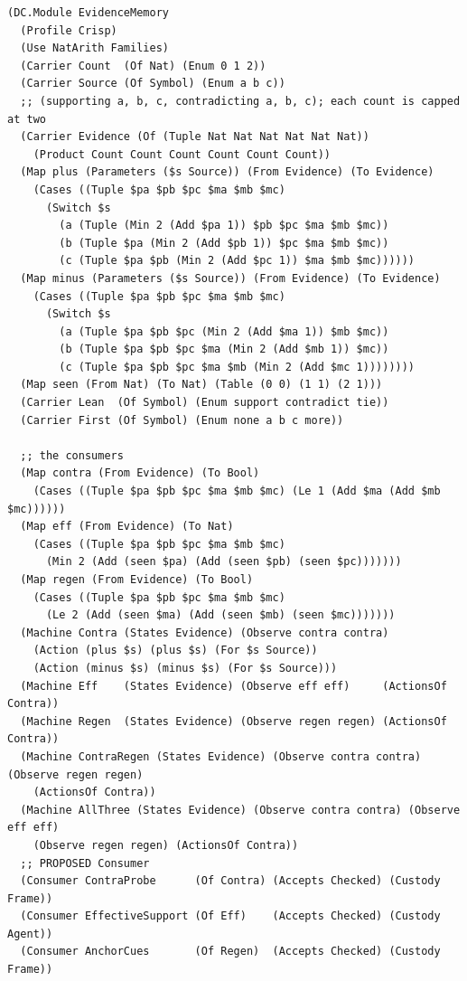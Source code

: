 \documentclass[11pt]{article}
\theoremstyle{definition}
\theoremstyle{plain}
\begin{document}
\begin{lstlisting}[style=mettamod]
(DC.Module EvidenceMemory
  (Profile Crisp)
  (Use NatArith Families)
  (Carrier Count  (Of Nat) (Enum 0 1 2))
  (Carrier Source (Of Symbol) (Enum a b c))
  ;; (supporting a, b, c, contradicting a, b, c); each count is capped at two
  (Carrier Evidence (Of (Tuple Nat Nat Nat Nat Nat Nat))
    (Product Count Count Count Count Count Count))
  (Map plus (Parameters ($s Source)) (From Evidence) (To Evidence)
    (Cases ((Tuple $pa $pb $pc $ma $mb $mc)
      (Switch $s
        (a (Tuple (Min 2 (Add $pa 1)) $pb $pc $ma $mb $mc))
        (b (Tuple $pa (Min 2 (Add $pb 1)) $pc $ma $mb $mc))
        (c (Tuple $pa $pb (Min 2 (Add $pc 1)) $ma $mb $mc))))))
  (Map minus (Parameters ($s Source)) (From Evidence) (To Evidence)
    (Cases ((Tuple $pa $pb $pc $ma $mb $mc)
      (Switch $s
        (a (Tuple $pa $pb $pc (Min 2 (Add $ma 1)) $mb $mc))
        (b (Tuple $pa $pb $pc $ma (Min 2 (Add $mb 1)) $mc))
        (c (Tuple $pa $pb $pc $ma $mb (Min 2 (Add $mc 1))))))))
  (Map seen (From Nat) (To Nat) (Table (0 0) (1 1) (2 1)))
  (Carrier Lean  (Of Symbol) (Enum support contradict tie))
  (Carrier First (Of Symbol) (Enum none a b c more))

  ;; the consumers
  (Map contra (From Evidence) (To Bool)
    (Cases ((Tuple $pa $pb $pc $ma $mb $mc) (Le 1 (Add $ma (Add $mb $mc))))))
  (Map eff (From Evidence) (To Nat)
    (Cases ((Tuple $pa $pb $pc $ma $mb $mc)
      (Min 2 (Add (seen $pa) (Add (seen $pb) (seen $pc)))))))
  (Map regen (From Evidence) (To Bool)
    (Cases ((Tuple $pa $pb $pc $ma $mb $mc)
      (Le 2 (Add (seen $ma) (Add (seen $mb) (seen $mc)))))))
  (Machine Contra (States Evidence) (Observe contra contra)
    (Action (plus $s) (plus $s) (For $s Source))
    (Action (minus $s) (minus $s) (For $s Source)))
  (Machine Eff    (States Evidence) (Observe eff eff)     (ActionsOf Contra))
  (Machine Regen  (States Evidence) (Observe regen regen) (ActionsOf Contra))
  (Machine ContraRegen (States Evidence) (Observe contra contra) (Observe regen regen)
    (ActionsOf Contra))
  (Machine AllThree (States Evidence) (Observe contra contra) (Observe eff eff)
    (Observe regen regen) (ActionsOf Contra))
  ;; PROPOSED Consumer
  (Consumer ContraProbe      (Of Contra) (Accepts Checked) (Custody Frame))
  (Consumer EffectiveSupport (Of Eff)    (Accepts Checked) (Custody Agent))
  (Consumer AnchorCues       (Of Regen)  (Accepts Checked) (Custody Frame))


\end{lstlisting}
\end{document}

